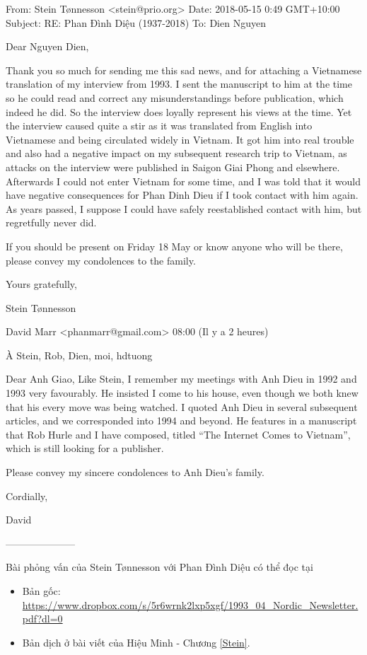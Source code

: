 From: Stein Tønnesson <stein@prio.org>
Date: 2018-05-15 0:49 GMT+10:00
Subject: RE: Phan Đình Diệu (1937-2018)
To: Dien Nguyen

Dear Nguyen Dien,
 
Thank you so much for sending me this sad news, and for attaching a Vietnamese translation of my interview from 1993. I sent the manuscript to him at the time so he could read and correct any misunderstandings before publication, which indeed he did. So the interview does loyally represent his views at the time. Yet the interview caused quite a stir as it was translated from English into Vietnamese and being circulated widely in Vietnam. It got him into real trouble and also had a negative impact on my subsequent research trip to Vietnam, as attacks on the interview were published in Saigon Giai Phong and elsewhere. Afterwards I could not enter Vietnam for some time, and I was told that it would have negative consequences for Phan Dinh Dieu if I took contact with him again. As years passed, I suppose I could have safely reestablished contact with him, but regretfully never did.
 
If you should be present on Friday 18 May or know anyone who will be there, please convey my condolences to the family.
 
Yours gratefully,
 
Stein Tønnesson


David Marr <phanmarr@gmail.com> 
	08:00 (Il y a 2 heures)
	
	
À Stein, Rob, Dien, moi, hdtuong 
 

Dear Anh Giao,
Like Stein, I remember my meetings with Anh Dieu in 1992 and 1993 very favourably.  He insisted I come to his house, even though we both knew that his every move was being watched.  I quoted Anh Dieu in several subsequent articles, and we corresponded into 1994 and beyond.  He features in a manuscript that Rob Hurle and I have composed, titled “The Internet Comes to Vietnam”, which is still looking for a publisher.

Please convey my sincere condolences to Anh Dieu’s family.

Cordially,

David

---------------------

Bài phỏng vấn của Stein Tønnesson với Phan Đình Diệu có thể đọc tại
\begin{itemize}
\item Bản gốc: \url{https://www.dropbox.com/s/5r6wrnk2lxp5xgf/1993_04_Nordic_Newsletter.pdf?dl=0}
\item Bản dịch ở bài viết của Hiệu Minh - Chương \ref{Stein}. 
\end{itemize}